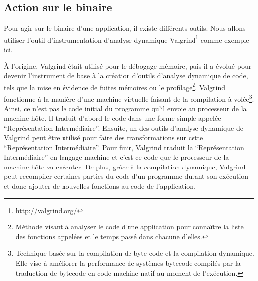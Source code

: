 \subsection{Action sur le binaire}
\label{subsubsection:valgrind}

Pour agir sur le binaire d'une application, il existe différents outils. Nous
allons utiliser l'outil d'instrumentation d'analyse dynamique Valgrind\footnote{\url{http://valgrind.org/}} \citep{Valgrind} comme exemple ici.

À l'origine, Valgrind était utilisé pour le débogage mémoire, puis il a évolué
pour devenir l'instrument de base à la création d'outils d'analyse dynamique de
code, tels que la mise en évidence de fuites mémoires ou le
profilage\footnote{Méthode visant à analyser le code d'une application pour
connaître la liste des fonctions appelées et le temps passé dans chacune
d'elles.}. Valgrind fonctionne à la manière d'une machine virtuelle faisant de la
compilation à volée\footnote{Technique basée sur la compilation de byte-code et
la compilation dynamique. Elle vise à améliorer la performance de systèmes
bytecode-compilés par la traduction de bytecode en code machine natif au moment
de l'exécution.}. Ainsi, ce n'est pas le code initial du programme qu'il envoie
au processeur de la machine hôte. Il traduit d'abord le code dans une forme
simple appelée ``Représentation Intermédiaire''. Ensuite, un des outils
d'analyse dynamique de Valgrind peut être utilisé pour faire des transformations
sur cette ``Représentation Intermédiaire''. Pour finir, Valgrind traduit la
``Représentation Intermédiaire'' en langage machine et c'est ce code que le
processeur de la machine hôte va exécuter. De plus, grâce à la compilation
dynamique, Valgrind peut recompiler certaines parties du code d'un programme
durant son exécution et donc ajouter de nouvelles fonctions au code de
l'application.

